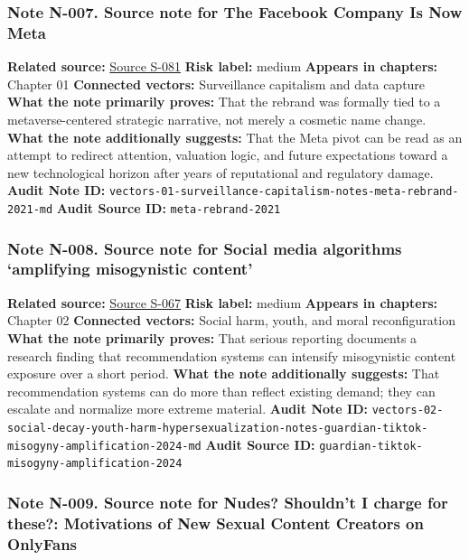 \documentclass[
  american,
  11pt,
  letterpaper,
]{article}
\begin{document}
\subsubsection{Note N-007. Source note for The Facebook Company Is Now
Meta}\label{note-n-007-vectors-01-surveillance-capitalism-notes-meta-rebrand-2021-md}

\textbf{Related source:}
\hyperref[source-s-081-the-facebook-company-is-now-meta]{Source S-081}
\textbf{Risk label:} medium \textbf{Appears in chapters:} Chapter 01
\textbf{Connected vectors:} Surveillance capitalism and data capture
\textbf{What the note primarily proves:} That the rebrand was formally
tied to a metaverse-centered strategic narrative, not merely a cosmetic
name change. \textbf{What the note additionally suggests:} That the Meta
pivot can be read as an attempt to redirect attention, valuation logic,
and future expectations toward a new technological horizon after years
of reputational and regulatory damage. \textbf{Audit Note ID:}
\texttt{vectors-01-surveillance-capitalism-notes-meta-rebrand-2021-md}
\textbf{Audit Source ID:} \texttt{meta-rebrand-2021}

\subsubsection{Note N-008. Source note for Social media algorithms
`amplifying misogynistic
content'}\label{note-n-008-vectors-02-social-decay-youth-harm-hypersexualization-notes-guardian-tiktok-misogyny-amplification-2024-md}

\textbf{Related source:}
\hyperref[source-s-067-social-media-algorithms-amplifying-misogynistic-content]{Source
S-067} \textbf{Risk label:} medium \textbf{Appears in chapters:} Chapter
02 \textbf{Connected vectors:} Social harm, youth, and moral
reconfiguration \textbf{What the note primarily proves:} That serious
reporting documents a research finding that recommendation systems can
intensify misogynistic content exposure over a short period.
\textbf{What the note additionally suggests:} That recommendation
systems can do more than reflect existing demand; they can escalate and
normalize more extreme material. \textbf{Audit Note ID:}
\texttt{vectors-02-social-decay-youth-harm-hypersexualization-notes-guardian-tiktok-misogyny-amplification-2024-md}
\textbf{Audit Source ID:}
\texttt{guardian-tiktok-misogyny-amplification-2024}

\subsubsection{Note N-009. Source note for Nudes? Shouldn't I charge for
these?: Motivations of New Sexual Content Creators on
OnlyFans}\label{note-n-009-vectors-02-social-decay-youth-harm-hypersexualization-notes-hamilton-onlyfans-new-creators-2022-md}
\end{document}
